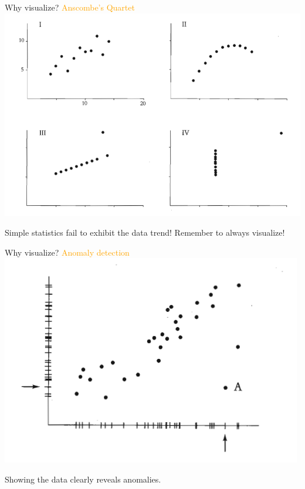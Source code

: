 \documentclass[
  ignorenonframetext,
]{beamer}
\begin{document}
\begin{frame}{Why visualize? \textcolor{orange}{Anscombe's Quartet}}
\label{why-visualize-1}
\includegraphics[width=0.8\linewidth,height=\textheight,keepaspectratio]{excellence_figs/fig_2.png}

Simple statistics fail to exhibit the data trend! Remember to always
visualize!
\end{frame}

\begin{frame}{Why visualize? \textcolor{orange}{Anomaly detection}}
\label{why-visualize-2}
\includegraphics[width=0.8\linewidth,height=\textheight,keepaspectratio]{excellence_figs/fig_3.png}

Showing the data clearly reveals anomalies.
\end{frame}
\end{document}
